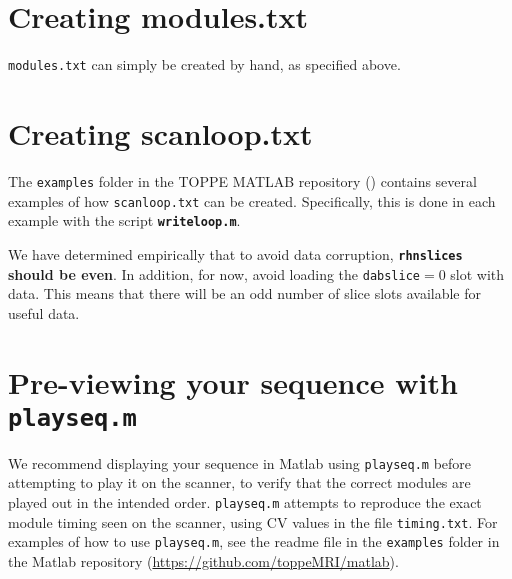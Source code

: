 \section{Creating modules.txt}
{\tt modules.txt} can simply be created by hand, as specified above.


\section{Creating scanloop.txt}
The {\tt examples} folder in the TOPPE MATLAB repository (\matrep) contains several examples of how {\tt scanloop.txt} can be created.
Specifically, this is done in each example with the script {\tt \bf writeloop.m}.

We have determined empirically that to avoid data corruption, {\bf{\tt rhnslices} should be even}.
In addition, for now, avoid loading the {\tt dabslice}$=0$ slot with data. 
This means that there will be an odd number of slice slots available for useful data.


\section{Pre-viewing your sequence with {\tt playseq.m} }

We recommend displaying your sequence in Matlab using \texttt{playseq.m} before attempting to play it on the scanner, to verify that the correct modules are played out in the intended order.
\texttt{playseq.m} attempts to reproduce the exact module timing seen on the scanner, using CV values in the file \texttt{timing.txt}.
For examples of how to use \texttt{playseq.m}, see the readme file in the {\tt examples} folder in the Matlab repository (\url{https://github.com/toppeMRI/matlab}).





